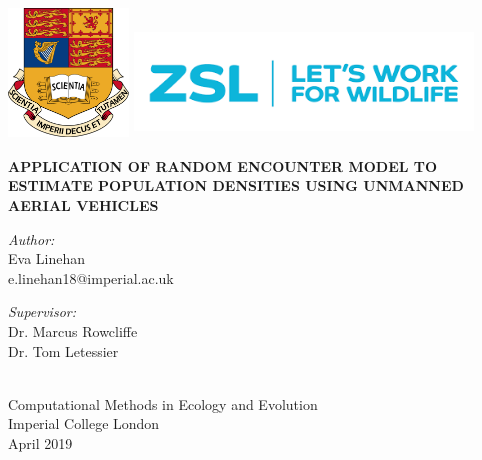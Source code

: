 \documentclass[11pt]{article}
\begin{document}
\begin{titlepage}
	\includegraphics[height = 35mm, width = 32mm]{../Writeup/crest.png}%
	\hfill
	\includegraphics[height = 30mm, width = 90mm]{../Writeup/zsl.png}
	
		\centering
		
		\vspace{5cm}
		{\uppercase{\textbf{\LARGE Application of Random Encounter Model to Estimate Population Densities Using Unmanned Aerial Vehicles \\}}}
		\vspace{6cm}
		\begin{minipage}[t]{0.4\textwidth}
			\begin{flushleft} \large
				\emph{Author:} \\
				Eva Linehan\\
				e.linehan18@imperial.ac.uk
			\end{flushleft}
		\end{minipage}
		\begin{minipage}[t]{0.4\textwidth}
			\begin{flushright} \large
				\emph{Supervisor:} \\
				Dr. Marcus Rowcliffe \\
				Dr. Tom Letessier
			\end{flushright}
		\end{minipage}\\[3cm]
		
		Computational Methods in Ecology and Evolution\\
		Imperial College London\\
		April 2019\\
\end{titlepage}
\end{document}
